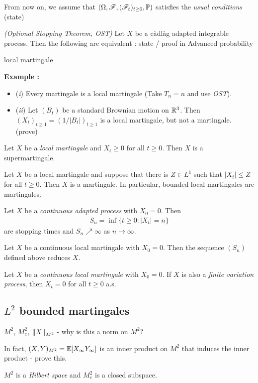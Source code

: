 \documentclass[10pt,a4paper]{article}
\renewenvironment{i}
{\begin{itemize} 
	}%
	{\end{itemize}
}
\begin{document}
From now on, we assume that $(\Omega, \mathscr{F}, (\mathscr{F}_t)_{t\geq 0}, \mathbb{P})$ satisfies the \emph{usual conditions} (state)
\s

\thm \emph{(Optional Stopping Theorem, OST)} Let $X$ be a c\`adl\`ag adapted integrable process. Then the following are equivalent : state / proof in Advanced probability
\s

 local martingale
\s

\textbf{Example :} 
\begin{i}
\item[(\textit{i})] Every martingale is a local martingale (Take $T_n = n$ and use \emph{OST}).
\item[(\textit{ii})] Let $(B_t)$ be a standard Brownian motion on $\mathbb{R}^3$. Then $(X_t)_{t\geq 1} = (1/|B_t|)_{t\geq 1}$ is a local martingale, but not a martingale. (prove)
\end{i}
\s

\prop Let $X$ be a \emph{local martingale} and $X_t \geq 0$ for all $t\geq 0$. Then $X$ is a supermartingale.
\s

\prop Let $X$ be a local martingale and suppose that there is $Z\in L^1$ such that $|X_t| \leq Z$ for all $t\geq 0$. Then $X$ is a martingale. In particular, bounded local martingales are martingales.
\s

\fact Let $X$ be a \emph{continuous adapted process} with $X_0 =0$. Then
\begin{align*}
S_n = \inf\{t\geq 0 : |X_t| =n\}
\end{align*}
are stopping times and $S_n \nearrow \infty$ as $n\rightarrow \infty.$
\s

\prop Let $X$ be a continuous local martingale with $X_0 =0$. Then the sequence $(S_n)$ defined above reduces $X$.
\s

\thm Let $X$ be a \emph{continuous local martingale} with $X_0 =0$. If $X$ is also a \emph{finite variation process}, then $X_t =0$ for all $t\geq 0$ a.s.

\subsection{$L^2$ bounded martingales}

 $M^2$, $M_c^2$, $\snorms{X}{M^2}$ - why is this a norm on $M^2$?

\quad In fact, $(X, Y)_{M^2} = \mathbb{E}[X_{\infty}Y_{\infty}]$ is an inner product on $M^2$ that induces the inner product - prove this.
\s

\prop $M^2$ is a \emph{Hilbert space} and $M_c^2$ is a closed subspace.
\end{document}
